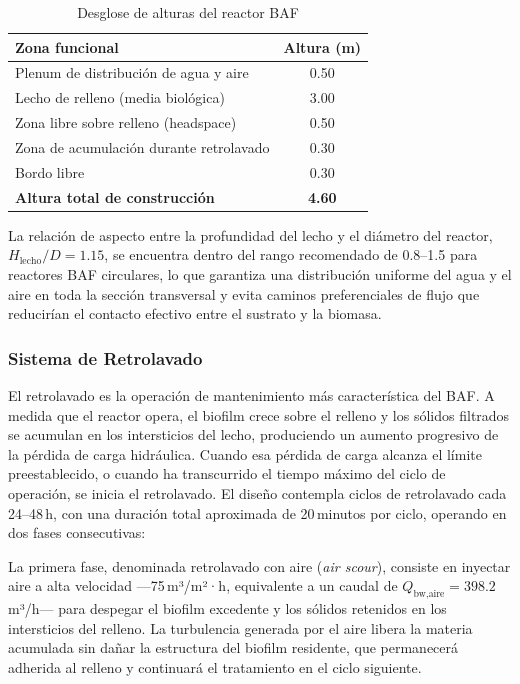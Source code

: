 \begin{table}[H]
\centering
\caption{Desglose de alturas del reactor BAF}
\begin{tabular}{lc}
\toprule
\textbf{Zona funcional} & \textbf{Altura (m)} \\
\midrule
Plenum de distribución de agua y aire & 0.50 \\
Lecho de relleno (media biológica) & 3.00 \\
Zona libre sobre relleno (headspace) & 0.50 \\
Zona de acumulación durante retrolavado & 0.30 \\
Bordo libre & 0.30 \\
\midrule
\textbf{Altura total de construcción} & \textbf{4.60} \\
\bottomrule
\end{tabular}
\end{table}

La relación de aspecto entre la profundidad del lecho y el diámetro del reactor, $H_{\text{lecho}} / D = 1.15$, se encuentra dentro del rango recomendado de 0.8--1.5 para reactores BAF circulares, lo que garantiza una distribución uniforme del agua y el aire en toda la sección transversal y evita caminos preferenciales de flujo que reducirían el contacto efectivo entre el sustrato y la biomasa.

\subsubsection*{Sistema de Retrolavado}

El retrolavado es la operación de mantenimiento más característica del BAF. A medida que el reactor opera, el biofilm crece sobre el relleno y los sólidos filtrados se acumulan en los intersticios del lecho, produciendo un aumento progresivo de la pérdida de carga hidráulica. Cuando esa pérdida de carga alcanza el límite preestablecido, o cuando ha transcurrido el tiempo máximo del ciclo de operación, se inicia el retrolavado. El diseño contempla ciclos de retrolavado cada 24--48\,h, con una duración total aproximada de 20\,minutos por ciclo, operando en dos fases consecutivas:

La primera fase, denominada retrolavado con aire (\textit{air scour}), consiste en inyectar aire a alta velocidad —75\,m³/m²·h, equivalente a un caudal de $Q_{\text{bw,aire}} = 398.2$\,m³/h— para despegar el biofilm excedente y los sólidos retenidos en los intersticios del relleno. La turbulencia generada por el aire libera la materia acumulada sin dañar la estructura del biofilm residente, que permanecerá adherida al relleno y continuará el tratamiento en el ciclo siguiente.


